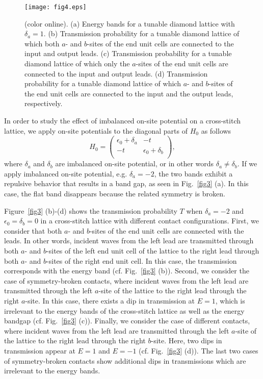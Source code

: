 \documentclass[twocolumn,showpacs,epsfig,pre]{revtex4}
\newcommand{\figsizeone}{0.48}
\begin{document}
\begin{figure}
\begin{center}
\texttt{[image: fig4.eps]}
\caption{(color online).
(a) Energy bands for a tunable diamond lattice with $\delta_a = 1$.
(b) Transmission probability for a tunable diamond lattice of which both $a$- and $b$-sites of the end unit cells are connected to the input and output leads.
(c) Transmission probability for a tunable diamond lattice of which only the $a$-sites of the end unit cells are connected to the input and output leads.
(d) Transmission probability for a tunable diamond lattice of which $a$- and $b$-sites of the end unit cells are connected to the input and the output leads, respectively.
}
\label{fig4}
\end{center}
\end{figure}

In order to study the effect of imbalanced on-site potential on a cross-stitch lattice, we apply on-site potentials to the diagonal parts of $H_0$ as follows
\begin{equation}
 H_0 = \left(\begin{array}{cc}
 \epsilon_0 + \delta_a & -t \\
 -t & \epsilon_0 + \delta_b \\
\end{array}\right),
\end{equation}
where $\delta_a$ and $\delta_b$ are imbalanced on-site potential, or in other words $\delta_a \neq \delta_b$.
If we apply imbalanced on-site potential, e.g. $\delta_a = -2$,
the two bands exhibit a repulsive behavior that results in a band gap, as seen in Fig.~\ref{fig3} (a).
In this case, the flat band disappears because the related symmetry is broken.

Figure~\ref{fig3} (b)-(d) shows the transmission probability $T$ when $\delta_a = -2$ and $\epsilon_0 = \delta_b = 0$ in a cross-stitch lattice with different contact configurations. First, we consider that both $a$- and $b$-sites of the end unit cells are connected with the leads. In other words, incident waves from the left lead are transmitted through both $a$- and $b$-sites of the left end unit cell of the lattice to the right lead through both $a$- and $b$-sites of the right end unit cell. In this case, the transmission corresponds with the energy band (cf. Fig.~\ref{fig3} (b)). Second, we consider the case of symmetry-broken contacts, where incident waves from the left lead are transmitted through the left $a$-site of the lattice to the right lead through the right $a$-site. In this case, there exists a dip in transmission at $E=1$, which is irrelevant to the energy bands of the cross-stitch lattice as well as the energy bandgap (cf. Fig.~\ref{fig3} (c)). Finally, we consider the case of different contacts, where incident waves from the left lead are transmitted through the left $a$-site of the lattice to the right lead through the right $b$-site. Here, two dips in transmission appear at $E=1$ and $E=-1$ (cf. Fig.~\ref{fig3} (d)). The last two cases of symmetry-broken contacts show additional dips in transmissions which are irrelevant to the energy bands.
\end{document}
